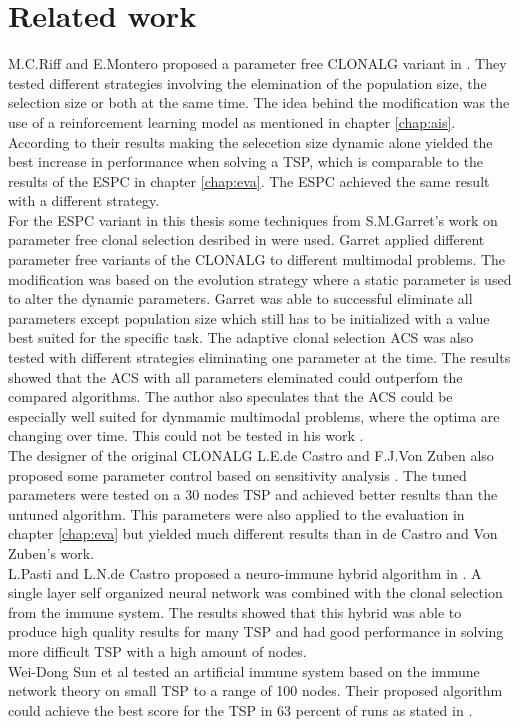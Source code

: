 \chapter{Related work}
\label{chap:rlw}
M.C.Riff and E.Montero proposed a parameter free CLONALG variant in \cite{RIFF09}. They tested different strategies involving the elemination of the population size, the selection size or both at the same time. The idea behind the modification was the use of a reinforcement learning model as mentioned in chapter \ref{chap:ais}. According to their results making the selecetion size dynamic alone yielded the best increase in performance when solving a TSP, which is comparable to the results of the ESPC in chapter \ref{chap:eva}. The ESPC achieved the same result with a different strategy.\\
For the ESPC variant in this thesis some techniques from S.M.Garret's work on parameter free clonal selection desribed in \cite{Garret04} were used. Garret applied different parameter free variants of the CLONALG to different multimodal problems. The modification was based on the evolution strategy where a static parameter is used to alter the dynamic parameters. Garret was able to successful eliminate all parameters except population size which still has to be initialized with a value best suited for the specific task. The adaptive clonal selection ACS was also tested with different strategies eliminating one parameter at the time. The results showed that the ACS with all parameters eleminated could outperfom the compared algorithms. The author also speculates that the ACS could be especially well suited for dynmamic multimodal problems, where the optima are changing over time. This could not be tested in his work \cite{Garret04}.\\
The designer of the original CLONALG L.E.de Castro and F.J.Von Zuben also proposed some parameter control based on sensitivity analysis \cite{DEC02}. The tuned parameters were tested on a 30 nodes TSP and achieved better results than the untuned algorithm. This parameters were also applied to the evaluation in chapter \ref{chap:eva} but yielded much different results than in de Castro and Von Zuben's work.\\
L.Pasti and L.N.de Castro proposed a neuro-immune hybrid algorithm in \cite{Pasti06}. A single layer self organized neural network was combined with the clonal selection from the immune system. The results showed that this hybrid was able to produce high quality results for many TSP and had good performance in solving more difficult TSP with a high amount of nodes.\\
Wei-Dong Sun et al tested an artificial immune system based on the immune network theory on small TSP to a range of 100 nodes. Their proposed algorithm could achieve the best score for the TSP in 63 percent of runs as stated in \cite{sun}. 